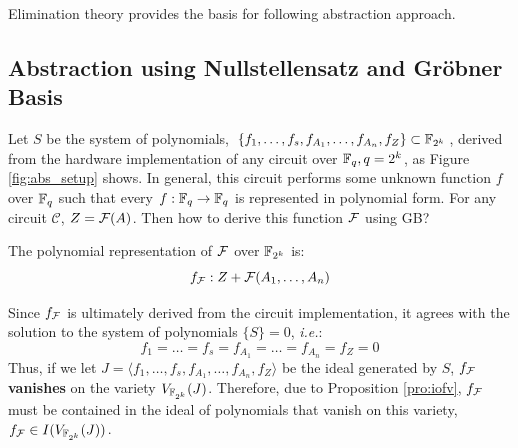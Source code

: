 Elimination theory provides the basis for following abstraction approach.
\subsection{Abstraction using Nullstellensatz and Gr\"obner Basis}
\begin{Problem}
\label{setup:abs}
Let $S$ be the system of polynomials, 
$\{f_1,\dots,f_s,f_{A_1},\dots,f_{A_n},f_{Z}\}\subset {\mathbb{F}}_{2^k}$, 
derived from the hardware
implementation of any circuit over ${\mathbb{F}}_{q}, q=2^k$, as Figure \ref{fig:abs_setup} shows.
In general, this circuit performs some unknown function $f$ over 
${\mathbb{F}}_{q}$ such that every $f:{\mathbb{F}}_{q}\to{\mathbb{F}}_{q}$ is represented in polynomial form.
For any circuit $\mathcal C$, $Z = {\mathcal{F}}(A)$. Then how to derive this function ${\mathcal{F}}$
using GB?
\end{Problem}

\begin{figure}[bp]
\end{figure}

The polynomial representation of ${\mathcal{F}}$ over ${\mathbb{F}}_{2^k}$ is:
\begin{equation}
f_{{\mathcal{F}}}: Z+{\mathcal{F}}(A_1,\dots,A_n) \nonumber
\end{equation}

Since $f_{{\mathcal{F}}}$ is ultimately derived from the circuit implementation, 
it agrees with the solution to the system of polynomials $\{S\}=0$, {\it i.e.}:
\begin{equation}
f_1=\dots=f_s=f_{A_1}=\dots=f_{A_n}=f_{Z}=0 \nonumber
\end{equation}
Thus, if we let $J=\langle f_1,\dots,f_s,f_{A_1},\dots,f_{A_n},f_{Z}\rangle$ 
be the ideal generated by $S$, 
$f_{{\mathcal{F}}}$ {\bf vanishes} on the variety $V_{{\mathbb{F}}_{2^k}}(J)$. 
Therefore, due to Proposition \ref{pro:iofv}, 
$f_{{\mathcal{F}}}$ must be contained in the ideal of polynomials that vanish on
this variety, $f_{{\mathcal{F}}} \in I(V_{{\mathbb{F}}_{2^k}}(J))$. 

